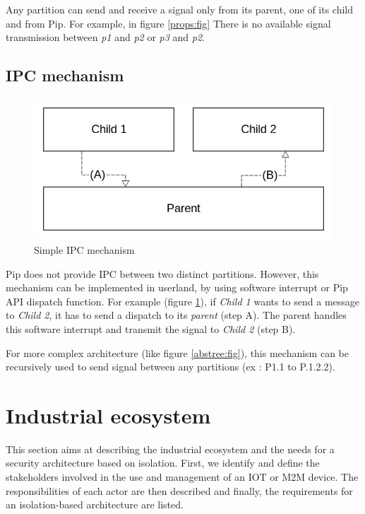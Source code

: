 \documentclass[conference]{IEEEtran}
\begin{document}
Any partition can send and receive a signal only from its parent, one of its child and from Pip. For example, in figure \ref{props:fig} There is no available signal transmission between \textit{p1} and \textit{p2} or \textit{p3} and \textit{p2}.


\subsection{IPC mechanism}
\begin{figure}[h!]
	\centering
	\includegraphics[width=0.7\linewidth]{figures/IPCDispatch}
	\caption{Simple IPC mechanism}
	\label{fig:ipcdispatch}
\end{figure}


Pip does not provide IPC between two distinct partitions. However, this mechanism can be implemented in userland, by using software interrupt or Pip API dispatch function. For example (figure \ref{fig:ipcdispatch}), if \textit{Child 1} wants to send a message to \textit{Child 2}, it has to send a dispatch to its \textit{parent} (step A). The parent handles this software interrupt and transmit the signal to \textit{Child 2} (step B).

For more complex architecture (like figure \ref{abstree:fig}), this mechanism can be recursively used to send signal between any partitions (ex : P1.1 to P.1.2.2).


 


\section{Industrial ecosystem}
\label{sec:Industrial_ecosystem}
This section aims at describing the industrial ecosystem and the needs for a security architecture based on isolation. First, we identify and define the stakeholders involved in the use and management of an IOT or M2M device. The responsibilities of each actor are then described and finally, the requirements for an isolation-based architecture are listed.\\
\end{document}

